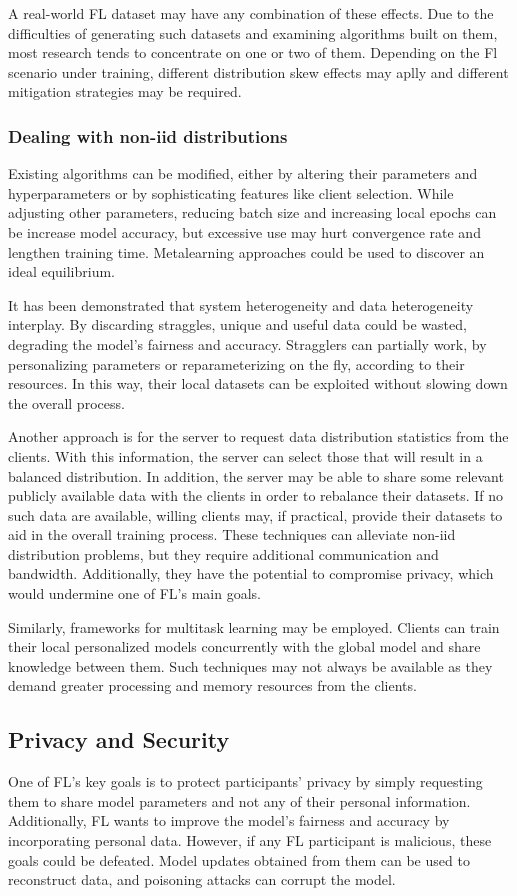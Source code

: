 A real-world FL dataset may have any combination of these effects. Due to the difficulties of generating such datasets and examining algorithms built on them, most research tends to concentrate on one or two of them. Depending on the Fl scenario under training, different distribution skew effects may aplly and different mitigation strategies may be required.

\subsubsection{Dealing with non-iid distributions}
Existing algorithms can be modified, either by altering their parameters and hyperparameters or by sophisticating features like client selection. While adjusting other parameters, reducing batch size and increasing local epochs can be increase model accuracy, but excessive use may hurt convergence rate and lengthen training time. Metalearning approaches could be used to discover an ideal equilibrium.

It has been demonstrated that system heterogeneity and data heterogeneity interplay. By discarding straggles, unique and useful data could be wasted, degrading the model's fairness and accuracy. Stragglers can partially work, by personalizing parameters or reparameterizing on the fly, according to their resources. In this way, their local datasets can be exploited without slowing down the overall process.

Another approach is for the server to request data distribution statistics from the clients. With this information, the server can select those that will result in a balanced distribution. In addition, the server may be able to share some relevant publicly available data with the clients in order to rebalance their datasets. If no such data are available, willing clients may, if practical, provide their datasets to aid in the overall training process. These techniques can alleviate non-iid distribution problems, but they require additional communication and bandwidth. Additionally, they have the potential to compromise privacy, which would undermine one of FL's main goals.

Similarly, frameworks for multitask learning may be employed. Clients can train their local personalized models concurrently with the global model and share knowledge between them. Such techniques may not always be available as they demand greater processing and memory resources from the clients.

\subsection{Privacy and Security}
One of FL's key goals is to protect participants' privacy by simply requesting them to share model parameters and not any of their personal information. Additionally, FL wants to improve the model's fairness and accuracy by incorporating personal data. However, if any FL participant is malicious, these goals could be defeated. Model updates obtained from them can be used to reconstruct data, and poisoning attacks can corrupt the model.

